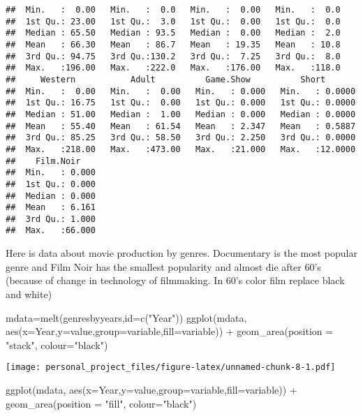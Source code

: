 \documentclass[
]{article}
\newenvironment{Shaded}{\begin{snugshade}}{\end{snugshade}}
\newcommand{\AttributeTok}[1]{\textcolor[rgb]{0.77,0.63,0.00}{#1}}
\newcommand{\FunctionTok}[1]{\textcolor[rgb]{0.00,0.00,0.00}{#1}}
\newcommand{\NormalTok}[1]{#1}
\newcommand{\OtherTok}[1]{\textcolor[rgb]{0.56,0.35,0.01}{#1}}
\newcommand{\SpecialCharTok}[1]{\textcolor[rgb]{0.00,0.00,0.00}{#1}}
\newcommand{\StringTok}[1]{\textcolor[rgb]{0.31,0.60,0.02}{#1}}
\begin{document}
\begin{verbatim}
##  Min.   :  0.00   Min.   :  0.0   Min.   :  0.00   Min.   :  0.0  
##  1st Qu.: 23.00   1st Qu.:  3.0   1st Qu.:  0.00   1st Qu.:  0.0  
##  Median : 65.50   Median : 93.5   Median :  0.00   Median :  2.0  
##  Mean   : 66.30   Mean   : 86.7   Mean   : 19.35   Mean   : 10.8  
##  3rd Qu.: 94.75   3rd Qu.:130.2   3rd Qu.:  7.25   3rd Qu.:  8.0  
##  Max.   :196.00   Max.   :222.0   Max.   :176.00   Max.   :118.0  
##     Western           Adult          Game.Show          Short        
##  Min.   :  0.00   Min.   :  0.00   Min.   : 0.000   Min.   : 0.0000  
##  1st Qu.: 16.75   1st Qu.:  0.00   1st Qu.: 0.000   1st Qu.: 0.0000  
##  Median : 51.00   Median :  1.00   Median : 0.000   Median : 0.0000  
##  Mean   : 55.40   Mean   : 61.54   Mean   : 2.347   Mean   : 0.5887  
##  3rd Qu.: 85.25   3rd Qu.: 58.50   3rd Qu.: 2.250   3rd Qu.: 0.0000  
##  Max.   :218.00   Max.   :473.00   Max.   :21.000   Max.   :12.0000  
##    Film.Noir     
##  Min.   : 0.000  
##  1st Qu.: 0.000  
##  Median : 0.000  
##  Mean   : 6.161  
##  3rd Qu.: 1.000  
##  Max.   :66.000
\end{verbatim}

Here is data about movie production by genres. Documentary is the most
popular genre and Film Noir has the smallest popularity and almost die
after 60's (because of change in technology of filmmaking. In 60's color
film replace black and white)

\begin{Shaded}
\begin{Highlighting}[]
\NormalTok{mdata}\OtherTok{=}\FunctionTok{melt}\NormalTok{(genresbyyears,}\AttributeTok{id=}\FunctionTok{c}\NormalTok{(}\StringTok{"Year"}\NormalTok{))}
\FunctionTok{ggplot}\NormalTok{(mdata, }\FunctionTok{aes}\NormalTok{(}\AttributeTok{x=}\NormalTok{Year,}\AttributeTok{y=}\NormalTok{value,}\AttributeTok{group=}\NormalTok{variable,}\AttributeTok{fill=}\NormalTok{variable)) }\SpecialCharTok{+} \FunctionTok{geom\_area}\NormalTok{(}\AttributeTok{position =} \StringTok{"stack"}\NormalTok{, }\AttributeTok{colour=}\StringTok{"black"}\NormalTok{)}
\end{Highlighting}
\end{Shaded}

\texttt{[image: personal\_project\_files/figure-latex/unnamed-chunk-8-1.pdf]}

\begin{Shaded}
\begin{Highlighting}[]
\FunctionTok{ggplot}\NormalTok{(mdata, }\FunctionTok{aes}\NormalTok{(}\AttributeTok{x=}\NormalTok{Year,}\AttributeTok{y=}\NormalTok{value,}\AttributeTok{group=}\NormalTok{variable,}\AttributeTok{fill=}\NormalTok{variable)) }\SpecialCharTok{+} \FunctionTok{geom\_area}\NormalTok{(}\AttributeTok{position =} \StringTok{"fill"}\NormalTok{, }\AttributeTok{colour=}\StringTok{"black"}\NormalTok{)}
\end{Highlighting}
\end{Shaded}
\end{document}
